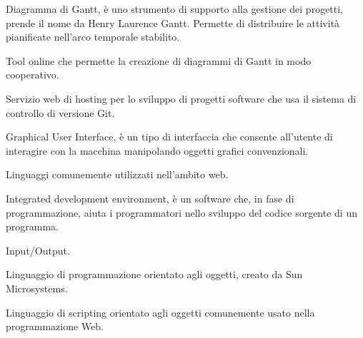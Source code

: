 
\begin{itemize}


Diagramma di Gantt, è uno strumento di supporto alla gestione dei progetti, prende il nome da Henry Laurence Gantt.
Permette di distribuire le attività pianificate nell'arco temporale stabilito.


Tool online che permette la creazione di diagrammi di Gantt in modo cooperativo.


Servizio web di hosting per lo sviluppo di progetti software che usa il sistema di controllo di versione Git.


Graphical User Interface, è un tipo di interfaccia che consente all'utente di interagire con la macchina manipolando oggetti grafici convenzionali.

\end{itemize}


\begin{itemize}


Linguaggi comunemente utilizzati nell'ambito web.

\end{itemize}


\begin{itemize}


Integrated development environment,  è un software che, in fase di programmazione, aiuta i programmatori nello sviluppo del codice sorgente di un programma.


Input/Output.

\end{itemize}


\begin{itemize}


Linguaggio di programmazione orientato agli oggetti, creato da Sun Microsystems.


Linguaggio di scripting orientato agli oggetti comunemente usato nella programmazione Web.

\end{itemize}

